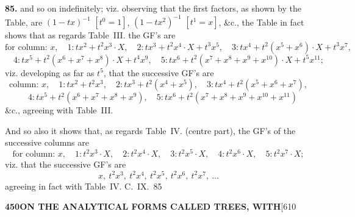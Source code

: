 \documentclass[11pt,a4paper]{book}
\begin{document}
{\noindent\textbf{85.}
and so on indefinitely; viz. observing that the first factors, as shown by the Table, are $(1-tx)^{-1}$ $[t^0=1]$, $(1-tx^2)^{-1}$ $[t^1=x]$, \&c., the Table in fact shows that as regards Table~III. the GF's are
\[
\text{for column: } x,\quad 1: tx^2 + t^2x^3 \cdot X,\quad 2: tx^3 + t^2x^4 \cdot X + t^3x^5,\quad 3: tx^4 + t^2(x^5 + x^6) \cdot X + t^3x^7,
\]
\[
\quad 4: tx^5 + t^2(x^6 + x^7 + x^8) \cdot X + t^4x^9,\quad 5: tx^6 + t^2(x^7 + x^8 + x^9 + x^{10}) \cdot X + t^5x^{11};
\]
viz. developing as far as $t^5$, that the successive GF's are
\[
\text{column: } x,\quad 1: tx^2 + t^2x^3,\quad 2: tx^3 + t^2(x^4 + x^5),\quad 3: tx^4 + t^2(x^5 + x^6 + x^7),
\]
\[
\quad 4: tx^5 + t^2(x^6 + x^7 + x^8 + x^9),\quad 5: tx^6 + t^2(x^7 + x^8 + x^9 + x^{10} + x^{11})
\]
\&c., agreeing with Table~III.

And so also it shows that, as regards Table~IV. (centre part), the GF's of the successive columns are
\[
\text{for column: } x,\quad 1: t^2x^3 \cdot X,\quad 2: t^2x^4 \cdot X,\quad 3: t^2x^5 \cdot X,\quad 4: t^2x^6 \cdot X,\quad 5: t^2x^7 \cdot X;
\]
viz. that the successive GF's are
\[
x,\ t^2x^3,\ t^2x^4,\ t^2x^5,\ t^2x^6,\ t^2x^7,\ \ldots
\]
agreeing in fact with Table~IV.
\hfill C.~IX.\ 85

\newpage
\noindent\textbf{450}\hspace{\fill}\textbf{ON THE ANALYTICAL FORMS CALLED TREES, WITH}\hspace{\fill}[610

}
\end{document}
